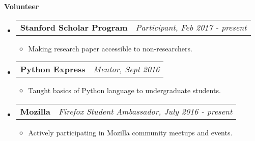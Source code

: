 \documentclass[letterpaper,11pt]{article}
\makeatletter
\newcommand{\resitem}[1]{\item #1 \vspace{-2pt}}
\newcommand{\resheading}[1]{{\large \colorbox{mygrey}{\begin{minipage}{\textwidth}{\textbf{#1 \vphantom{p\^{E}}}}\end{minipage}}}}
\newcommand{\ressubheading}[4]{
\begin{tabular*}{7.3in}{l@{\extracolsep{\fill}}r}
		\textbf{#1} & \textit{#4} \\
\end{tabular*}\vspace{-6pt}}
\makeatother
\begin{document}
\resheading{Volunteer}
\begin{itemize}


\item
	\ressubheading{Stanford Scholar Program}{Remote}{Participant}{Participant, Feb 2017 - present}
	\begin{itemize}
		\resitem{Making research paper accessible to non-researchers.}
	\end{itemize}

\item
	\ressubheading{Python Express}{Remote}{Mentor}{Mentor, Sept 2016}
	\begin{itemize}
		\resitem{Taught basics of Python language to undergraduate students.}
	\end{itemize}
	
\item
	\ressubheading{Mozilla}{Remote}{Firefox Student Ambassador}{Firefox Student Ambassador, July 2016 - present}
	\begin{itemize}
		\resitem{Actively participating in Mozilla community meetups and events.}
	\end{itemize}
	
	
\end{itemize}
\end{document}
